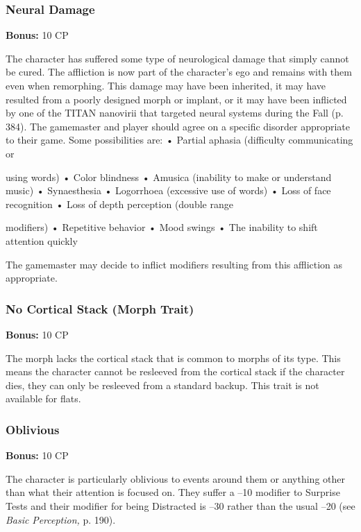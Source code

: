 \subsubsection{Neural Damage}

\textbf{Bonus:} 10 CP

The character has suffered some type of neurological
damage that simply cannot be cured. The affliction
is now part of the character's ego and remains with 
them even when remorphing. This damage may have 
been inherited, it may have resulted from a poorly designed
morph or implant, or it may have been inflicted
by one of the TITAN nanovirii that targeted neural 
systems during the Fall (p. 384). The gamemaster and 
player should agree on a specific disorder appropriate 
to their game. Some possibilities are:
•  Partial aphasia (difficulty communicating or 

using words)
•  Color blindness
•  Amusica (inability to make or understand music)
•  Synaesthesia
•  Logorrhoea (excessive use of words)
•  Loss of face recognition
•  Loss of depth perception (double range 

modifiers)
•  Repetitive behavior
•  Mood swings
•  The inability to shift attention quickly

The gamemaster may decide to inflict  modifiers 
resulting from this affliction as appropriate.

\subsubsection{No Cortical Stack (Morph Trait)}

\textbf{Bonus:} 10 CP

The morph lacks the cortical stack that is common 
to morphs of its type. This means the character cannot 
be resleeved from the cortical stack if the character 
dies, they can only be resleeved from a standard 
backup. This trait is not available for flats.

\subsubsection{Oblivious}

\textbf{Bonus:} 10 CP

The character is particularly oblivious to events 
around them or anything other than what their attention
is focused on. They suffer a –10 modifier
to Surprise Tests and their modifier for being Distracted
is –30 rather than the usual –20 (see \textit{Basic }
\textit{Perception,} p. 190).

